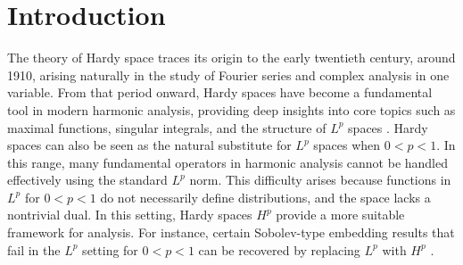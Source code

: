 \documentclass[11pt, reqno]{amsproc}
\theoremstyle{definition}
\theoremstyle{remark}
\numberwithin{equation}{section}
\begin{document}
\section{Introduction}\label{S:1}
The theory of Hardy space traces its origin to the early twentieth century, around 1910, arising naturally in the study of Fourier series and complex analysis in one variable. From that period onward, Hardy spaces have become a fundamental tool in modern harmonic analysis, providing deep insights into core topics such as maximal functions, singular integrals, and the structure of $L^p$ spaces \cite{Stein-book-1, Stein-1960}. Hardy spaces can also be seen as the natural substitute for $L^p$ spaces when $0 < p < 1$. In this range, many fundamental operators in harmonic analysis cannot be handled effectively using the standard $L^p$ norm. This difficulty arises because functions in $L^p$ for $0 < p < 1$ do not necessarily define distributions, and the space lacks a nontrivial dual. In this setting, Hardy spaces $H^p$ provide a more suitable framework for analysis. For instance, certain Sobolev-type embedding results that fail in the $L^p$ setting for $0 < p < 1$ can be recovered by replacing $L^p$ with $H^p$ \cite{Stein-book-2}.
\end{document}
